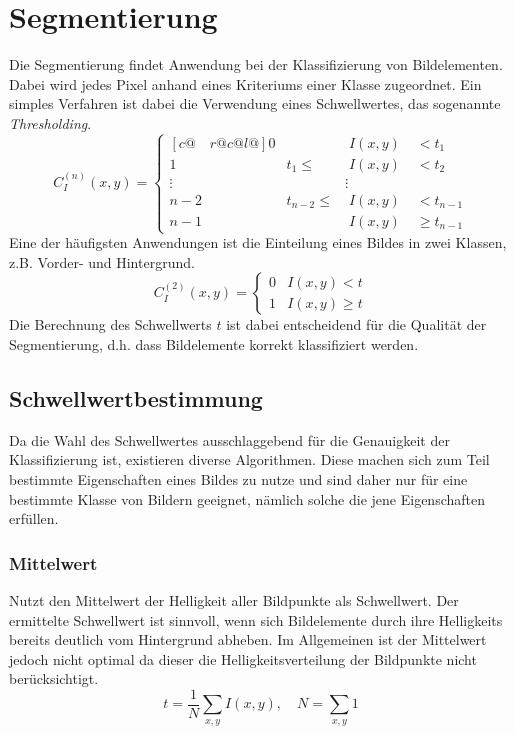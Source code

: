 \section{Segmentierung}
\writtenby{\dcauthornameewie}%
Die Segmentierung findet Anwendung bei der Klassifizierung von Bildelementen.
Dabei wird jedes Pixel anhand eines Kriteriums einer Klasse zugeordnet.
Ein simples Verfahren ist dabei die Verwendung eines Schwellwertes, das sogenannte \emph{Thresholding}.
%
  \[ C_I^{(n)}(x,y) = \begin{cases}[c@{\quad}r@{}c@{}l@{}]
       0      &              & \;I(x,y) & \;<    t_1     \\
       1      & t_1     \leq & \;I(x,y) & \;<    t_2     \\
       \vdots &              &   \vdots &                \\
       n-2    & t_{n-2} \leq & \;I(x,y) & \;<    t_{n-1} \\
       n-1    &              & \;I(x,y) & \;\geq t_{n-1}
     \end{cases} \]
%
Eine der häufigsten Anwendungen ist die Einteilung eines Bildes in zwei Klassen, z.B. Vorder- und Hintergrund.
%
  \[ C_I^{(2)}(x,y) = \begin{cases}
       0 & I(x,y) <    t \\
       1 & I(x,y) \geq t
     \end{cases} \]
%
Die Berechnung des Schwellwerts $t$ ist dabei entscheidend für die Qualität der Segmentierung, d.h. dass Bildelemente korrekt klassifiziert werden.

\subsection*{Schwellwertbestimmung}
Da die Wahl des Schwellwertes ausschlaggebend für die Genauigkeit der Klassifizierung ist, existieren diverse Algorithmen.
Diese machen sich zum Teil bestimmte Eigenschaften eines Bildes zu nutze und sind daher nur für eine bestimmte Klasse von Bildern geeignet, nämlich solche die jene Eigenschaften erfüllen.

\subsubsection*{Mittelwert}
Nutzt den Mittelwert der Helligkeit aller Bildpunkte als Schwellwert.
Der ermittelte Schwellwert ist sinnvoll, wenn sich Bildelemente durch ihre Helligkeits bereits deutlich vom Hintergrund abheben.
Im Allgemeinen ist der Mittelwert jedoch nicht optimal da dieser die Helligkeitsverteilung der Bildpunkte nicht berücksichtigt.
  \[ t = \frac{1}{N} \sum_{x,y} I(x,y), \quad N = \sum_{x,y} 1 \]

